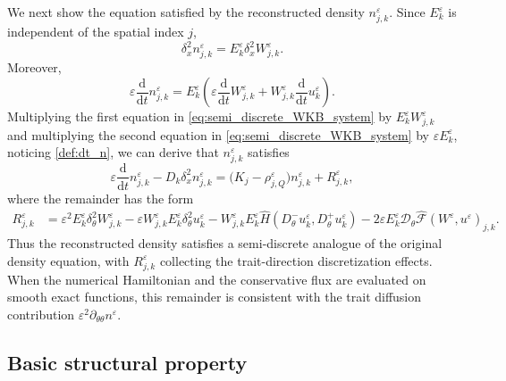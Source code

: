 \documentclass[11pt, dina4, amsfont12]{article}
\begin{document}
We next show the equation satisfied by the reconstructed density
\(n_{j,k}^\varepsilon\). Since \(E_k^\varepsilon\) is independent of the
spatial index \(j\),
\[
\delta_x^2 n_{j,k}^\varepsilon
=
E_k^\varepsilon\delta_x^2W_{j,k}^\varepsilon .
\]
Moreover,
\begin{equation}\label{def:dt_n}
\varepsilon\frac{\mathrm d}{\mathrm dt}n_{j,k}^\varepsilon
=
E_k^\varepsilon
\left(
\varepsilon\frac{\mathrm d}{\mathrm dt}W_{j,k}^\varepsilon
+
W_{j,k}^\varepsilon
\frac{\mathrm d}{\mathrm dt}u_k^\varepsilon
\right).
\end{equation}
Multiplying the first equation in \eqref{eq:semi_discrete_WKB_system} by $E_k^\varepsilon W_{j,k}^\varepsilon$ and multiplying the second equation in  \eqref{eq:semi_discrete_WKB_system} by $\varepsilon E_k^\varepsilon$, 
noticing \eqref{def:dt_n},
we can derive that \(n_{j,k}^\varepsilon\) satisfies
\begin{equation}\label{eq:semi_discrete_n}
\varepsilon\frac{\mathrm d}{\mathrm dt} n_{j,k}^\varepsilon
-
D_k\delta_x^2 n_{j,k}^\varepsilon
=
\bigl(K_j-\rho_{j,Q}^\varepsilon\bigr)n_{j,k}^\varepsilon
+
R_{j,k}^\varepsilon ,
\end{equation}
where the remainder has the form 
\begin{align}
R_{j,k}^\varepsilon
&=
\varepsilon^2
E_k^\varepsilon
\delta_\theta^2 W_{j,k}^\varepsilon
-
\varepsilon
W_{j,k}^\varepsilon
E_k^\varepsilon
\delta_\theta^2 u_k^\varepsilon
-
W_{j,k}^\varepsilon
E_k^\varepsilon
\widehat H
\left(
D_\theta^-u_k^\varepsilon,
D_\theta^+u_k^\varepsilon
\right)
-
2\varepsilon
E_k^\varepsilon
\mathcal D_\theta
\widehat{\mathcal F}(W^\varepsilon,u^\varepsilon)_{j,k}.
\label{eq:R_exact}
\end{align}
Thus the reconstructed density satisfies a semi-discrete analogue of the
original density equation, with \(R_{j,k}^\varepsilon\) collecting the
trait-direction discretization effects. When the numerical Hamiltonian and
the conservative flux are evaluated on smooth exact functions, this remainder
is consistent with the trait diffusion contribution
\(\varepsilon^2\partial_{\theta\theta}n^\varepsilon\).




\subsection{Basic structural property}
\end{document}
